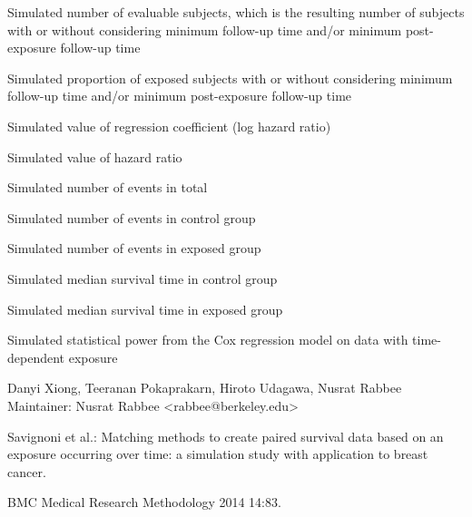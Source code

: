 \documentclass[a4paper]{book}
\begin{document}
\begin{Value}
\begin{ldescription}
\item[\code{N\_eff}] 
Simulated number of evaluable subjects, which is the resulting number of subjects with or without considering minimum follow-up time and/or minimum post-exposure follow-up time

\item[\code{N\_effexp\_p}] 
Simulated proportion of exposed subjects with or without considering minimum follow-up time and/or minimum post-exposure follow-up time

\item[\code{bhat}] 
Simulated value of regression coefficient (log hazard ratio)

\item[\code{HR}] 
Simulated value of hazard ratio

\item[\code{d}] 
Simulated number of events in total

\item[\code{d\_c}] 
Simulated number of events in control group

\item[\code{d\_exp}] 
Simulated number of events in exposed group

\item[\code{mst\_c}] 
Simulated median survival time in control group

\item[\code{mst\_exp}] 
Simulated median survival time in exposed group

\item[\code{pow}] Simulated statistical power from the Cox regression model on data with time-dependent exposure

\end{ldescription}
\end{Value}
%
\begin{Author}\relax

Danyi Xiong, Teeranan Pokaprakarn, Hiroto Udagawa, Nusrat Rabbee \\{}
Maintainer: Nusrat Rabbee <rabbee@berkeley.edu>
\end{Author}
%
\begin{References}\relax
Savignoni et al.: Matching methods to create paired survival data based on an exposure occurring over time: a simulation study with application to breast cancer. 

BMC Medical Research Methodology 2014 14:83. 
\end{References}
%
\end{document}
